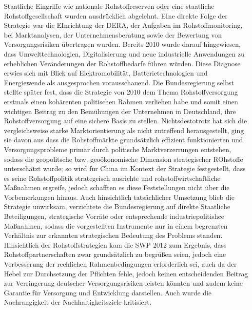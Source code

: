 \documentclass[12pt,a4paper,oneside]{book} %
\begin{document}
Staatliche Eingriffe wie nationale Rohstoffreserven oder eine staatliche Rohstoffgesellschaft wurden ausdrücklich abgelehnt. 
EIne direkte Folge der Strategie war die EInrichtung der DERA, der  Aufgaben im Rohstoffmonitoring, bei Marktanalysen, der Unternehmensberatung sowie der Bewertung von Versorgungsrisiken übertragen wurden. Bereits 2010 wurde darauf hingewiesen, dass Umwelttechnologien, Digitalisierung und neue industrielle Anwendungen zu erheblichen Veränderungen der Rohstoffbedarfe führen würden. Diese Diagnose erwies sich mit Blick auf Elektromobilität, Batterietechnologien und Energiewende als ausgesprochen vorausschauend.
Die Bundesregierung selbst stellte später fest, dass  die Strategie von 2010 dem Thema Rohstoffversorgung erstmals einen kohärenten politischen Rahmen verliehen habe und somit \glqq einen wichtigen Beitrag zu den Bemühungen der Unternehmen in Deutschland, ihre Rohstoffversorgung auf eine sichere Basis zu stellen\grqq. \autocite{Drucksache 19 16720, S. 2} Nichtsdestotrotz hat sich die vergleichsweise starke Marktorientierung als nicht zutreffend herausgestellt, ging sie davon aus dass die Rohstoffmärkte grundsätzlich effizient funktionierten und Versorgungsprobleme primär durch politische Marktverzerrungen entstehen, sodass die geopolitsche bzw. geoökonomische Dimension strategischer ROhstoffe unterschätzt wurde; so wird für China im Kontext der Strategie festgestellt, dass es seine Rohstoffpolitik strategeisch ausrichte und rohstoffwirtschaftliche Maßnahmen ergreife, jedoch schafften es diese Feststellungen nicht über die Vorbemerkungen hinaus. Auch hinsichtlich tatsächlicher Umsetzung blieb die Strategie unwirksam, verzichtete die Bundesregierung auf direkte Staatliche Beteiligungen, strategische Vorräte oder entsprechende industriepolitishce Maßnahmen, sodass die vorgestellten Instrumente nur in einem begrenzten Verhältnis zur erkannten strategischen Bedeutung des Problems standen. Hinsichtlich der Rohstoffstrategien kam die SWP 2012 zum Ergebnis, dass Rohstoffpartnerschaften zwar grundsätzlich zu begrüßen seien, jedoch eine Verbesserung der rechlichen Rahmenbedingungen erforderlich sei, auch da der Hebel zur Durchsetzung der Pflichten fehle, jedoch keinen entscheidenden Beitrag zur Verringerung deutscher Versorgungsrisiken leisten könnten und zudem keine Garantie für Versorgung und Entwicklung darstellen.\autocite{SWP-Aktuell 2012/A 16, 22.03.2012} Auch wurde die Nachrangigkeit der Nachhaltigkeitsziele kritisiert.\Autocite{https://refubium.fu-berlin.de/bitstream/fub188/19595/1/PolRess_AP2-Kurzanalysex2_Rohstoffpartnerschaften_FINAL.pdf}
\end{document}
